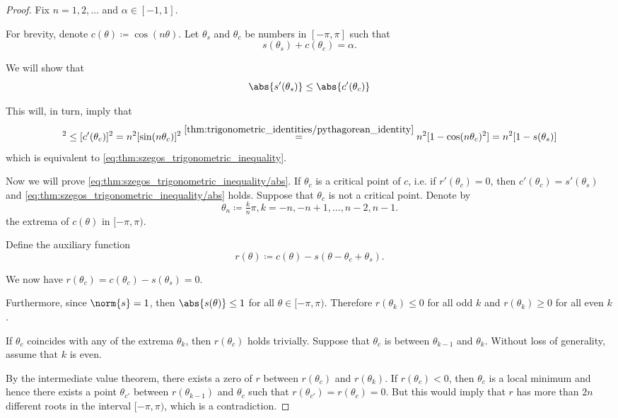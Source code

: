 \begin{proof}
  Fix \( n = 1, 2, \ldots \) and \( \alpha \in [-1, 1] \).

  For brevity, denote \( c(\theta) \coloneqq \cos(n \theta) \). Let \( \theta_s \) and \( \theta_c \) be numbers in \( [-\pi, \pi] \) such that
  \begin{equation*}
    s(\theta_s) + c(\theta_c) = \alpha.
  \end{equation*}

  We will show that
  \begin{equation}\label{eq:thm:szegos_trigonometric_inequality/abs}
    \abs{s'(\theta_s)} \leq \abs{c'(\theta_c)}
  \end{equation}

  This will, in turn, imply that
  \begin{equation*}
    [s'(\theta_s)]^2
    \leq
    [c'(\theta_c)]^2
    =
    n^2 [\sin(n \theta_c)]^2
    \overset {\ref{thm:trigonometric_identities/pythagorean_identity}}
    =
    n^2 [1 - \cos(n \theta_c)^2]
    =
    n^2 [1 - s(\theta_s)]
  \end{equation*}
  which is equivalent to \eqref{eq:thm:szegos_trigonometric_inequality}.

  Now we will prove \eqref{eq:thm:szegos_trigonometric_inequality/abs}. If \( \theta_c \) is a critical point of \( c \), i.e. if \( r'(\theta_c) = 0 \), then \( c'(\theta_c) = s'(\theta_s) \) and \eqref{eq:thm:szegos_trigonometric_inequality/abs} holds. Suppose that \( \theta_c \) is not a critical point. Denote by
  \begin{equation*}
    \theta_n \coloneqq \tfrac k n \pi, k = -n, -n+1, \ldots, n-2, n-1.
  \end{equation*}
  the extrema of \( c(\theta) \) in \( [-\pi, \pi) \).

  Define the auxiliary function
  \begin{equation*}
    r(\theta) \coloneqq c(\theta) - s(\theta - \theta_c + \theta_s).
  \end{equation*}

  We now have \( r(\theta_c) = c(\theta_c) - s(\theta_s) = 0 \).

  Furthermore, since \( \norm{s} = 1 \), then \( \abs{s(\theta)} \leq 1 \) for all \( \theta \in [-\pi, \pi) \). Therefore \( r(\theta_k) \leq 0 \) for all odd \( k \) and \( r(\theta_k) \geq 0 \) for all even \( k \).

  If \( \theta_c \) coincides with any of the extrema \( \theta_k \), then \( r(\theta_c) \) holds trivially. Suppose that \( \theta_c \) is between \( \theta_{k-1} \) and \( \theta_k \). Without loss of generality, assume that \( k \) is even.

  By the intermediate value theorem, there exists a zero of \( r \) between \( r(\theta_c) \) and \( r(\theta_k) \). If \( r(\theta_c) < 0 \), then \( \theta_c \) is a local minimum and hence there exists a point \( \theta_{c'} \) between \( r(\theta_{k-1}) \) and \( \theta_c \) such that \( r(\theta_{c'}) = r(\theta_c) = 0 \). But this would imply that \( r \) has more than \( 2n \) different roots in the interval \( [-\pi, \pi) \), which is a contradiction.
\end{proof}

